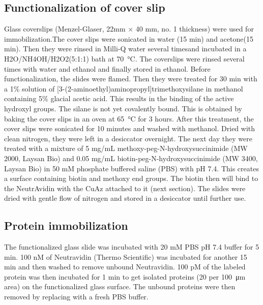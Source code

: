\documentclass[journal=jacsat,manuscript=article]{achemso}
\begin{document}
\subsection{Functionalization of cover slip}
Glass coverslips (Menzel-Glaser, 22mm × 40 mm, no. 1 thickness) were used for immobilization.The cover slips were sonicated in water (15 min) and acetone(15 min). Then they were rinsed in Milli-Q water several timesand incubated in a H2O/NH4OH/H2O2(5:1:1) bath at \SI{70}{\celsius}. The coverslips were rinsed several times with water and ethanol and finally stored in ethanol. Before functionalization, the slides were flamed. Then they were treated for 30 min with a 1\% solution of [3-(2-aminoethyl)aminopropyl]trimethoxysilane in methanol containing 5\% glacial acetic acid. This results in the binding of the active hydroxyl groups. The silane is not yet covalently bound. This is obtained by baking the cover slips in an oven at \SI{65}{\celsius} for 3 hours. After this treatment, the cover slips were sonicated for 10 minutes and washed with methanol. Dried with clean nitrogen, they were left in a desiccator overnight. The next day they were treated with a mixture of 5 mg/mL methoxy-peg-N-hydroxysuccinimide (MW 2000, Laysan Bio) and 0.05 mg/mL
biotin-peg-N-hydroxysuccinimide (MW 3400, Laysan Bio) in 50 mM phosphate buffered saline (PBS) with pH 7.4. This creates a surface containing biotin and methoxy end groups. The biotin then will bind to the NeutrAvidin with the CuAz attached to it (next section). The slides were dried with gentle flow of nitrogen and stored in a desiccator until further use.
\subsection{Protein immobilization}
The functionalized glass slide was incubated with 20 mM PBS pH 7.4 buffer for 5 min. 100 nM of Neutravidin (Thermo Scientific) was incubated for another 15 min and then washed to remove unbound Neutravidin. 100 pM of the labeled protein was then incubated for 1 min to get isolated proteins (20 per \SI{100}{\micro\meter} area) on the functionalized glass surface. The unbound proteins were then removed by replacing with a fresh PBS buffer.
\end{document}
